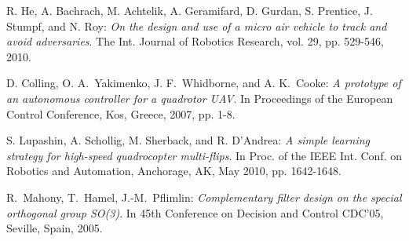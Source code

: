 
\begin{thebibliography}{99}



 {\sc R. He, A. Bachrach, M. Achtelik, A. Geramifard, D. Gurdan, S. Prentice,
J. Stumpf, and N. Roy}: 
{\it On the design and use of a micro air
vehicle to track and avoid adversaries}. The Int. Journal of Robotics
Research, vol. 29, pp. 529-546, 2010.


 {\sc D. Colling, O. A.~Yakimenko, J. F.~Whidborne, and A. K.~Cooke}:
{\it A prototype of an autonomous controller for a quadrotor UAV}. In
Proceedings of the European Control Conference, Kos, Greece, 2007,
pp. 1-8.

 {\sc S. Lupashin, A. Schollig, M. Sherback, and R. D'Andrea}:
 {\it A simple
learning strategy for high-speed quadrocopter multi-flips}.
In Proc. of
the IEEE Int. Conf. on Robotics and Automation, Anchorage, AK,
May 2010, pp. 1642-1648.



 {\sc R.~Mahony, T.~Hamel, J.-M.~Pflimlin}:
{\it Complementary filter design on the special orthogonal group SO(3)}. In 45th Conference
on Decision and Control CDC'05, Seville, Spain, 2005.


\end{thebibliography}
